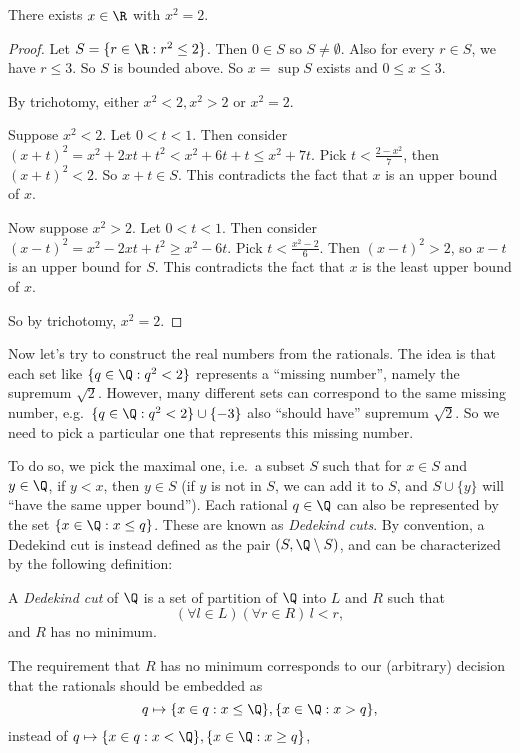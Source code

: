 \documentclass[a4paper]{article}
\begin{document}
\begin{thm}
  There exists $x\in \R$ with $x^2 = 2$.
\end{thm}

\begin{proof}
  Let $S = \{r\in \R: r^2 \leq 2\}$. Then $0\in S$ so $S\not= \emptyset$. Also for every $r \in S$, we have $r \leq 3$. So $S$ is bounded above. So $x = \sup S$ exists and $0\leq x \leq 3$.

  By trichotomy, either $x^2 < 2, x^2 > 2$ or $x^2 = 2$.

  Suppose $x^2 < 2$. Let $0 < t < 1$. Then consider $(x + t)^2 = x^2 + 2xt + t^2 < x^2 + 6t + t \leq x^2 + 7t$. Pick $t < \frac{2 - x^2}{7}$, then $(x + t)^2 < 2$. So $x + t \in S$. This contradicts the fact that $x$ is an upper bound of $x$.

  Now suppose $x^2 > 2$. Let $0 < t < 1$. Then consider $(x - t)^2 = x^2 - 2xt + t^2 \geq x^2 - 6t$. Pick $t < \frac{x^2 - 2}{6}$. Then $(x - t)^2 > 2$, so $x - t$ is an upper bound for $S$. This contradicts the fact that $x$ is the least upper bound of $x$.

  So by trichotomy, $x^2 = 2$.
\end{proof}

Now let's try to construct the real numbers from the rationals. The idea is that each set like $\{q\in \Q: q^2 < 2\}$ represents a ``missing number'', namely the supremum $\sqrt{2}$. However, many different sets can correspond to the same missing number, e.g.\ $\{q \in \Q: q^2 < 2\} \cup \{-3\}$ also ``should have'' supremum $\sqrt{2}$. So we need to pick a particular one that represents this missing number.

To do so, we pick the maximal one, i.e.\ a subset $S$ such that for $x \in S$ and $y \in \Q$, if $y < x$, then $y \in S$ (if $y$ is not in $S$, we can add it to $S$, and $S \cup \{y\}$ will ``have the same upper bound''). Each rational $q \in \Q$ can also be represented by the set $\{x \in \Q: x \leq q\}$. These are known as \emph{Dedekind cuts}. By convention, a Dedekind cut is instead defined as the pair $(S, \Q \setminus S)$, and can be characterized by the following definition:

\begin{defi}
  A \emph{Dedekind cut} of $\Q$ is a set of partition of $\Q$ into $L$ and $R$ such that
  \[
    (\forall l\in L)(\forall r\in R)\,l < r,
  \]
  and $R$ has no minimum.
\end{defi}
The requirement that $R$ has no minimum corresponds to our (arbitrary) decision that the rationals should be embedded as
\[
  q\mapsto \{x\in q: x \leq \Q\}, \{x\in \Q: x> q\},
\]
instead of $q\mapsto \{x\in q: x < \Q\}, \{x\in \Q: x \geq q\}$,
\end{document}
